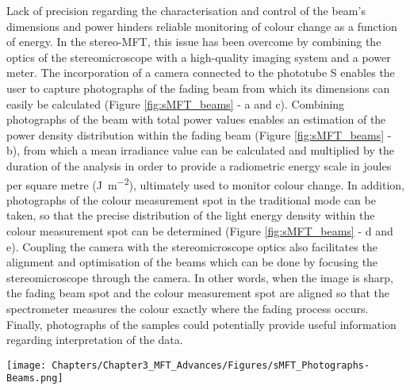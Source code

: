 Lack of precision regarding the characterisation and control of the beam’s dimensions and power hinders reliable monitoring of colour change as a function of energy. In the stereo-MFT, this issue has been overcome by combining the optics of the stereomicroscope with a high-quality imaging system and a power meter. The incorporation of a camera connected to the phototube S enables the user to capture photographs of the fading beam from which its dimensions can easily be calculated (Figure \ref{fig:sMFT_beams} - a and c). Combining photographs of the beam with total power values enables an estimation of the power density distribution within the fading beam (Figure \ref{fig:sMFT_beams} - b), from which a mean irradiance value can be calculated and multiplied by the duration of the analysis in order to provide a radiometric energy scale in joules per square metre (\unit{\joule\per\square\metre}), ultimately used to monitor colour change. In addition, photographs of the colour measurement spot in the traditional mode can be taken, so that the precise distribution of the light energy density within the colour measurement spot can be determined (Figure \ref{fig:sMFT_beams} - d and e). Coupling the camera with the stereomicroscope optics also facilitates the alignment and optimisation of the beams which can be done by focusing the stereomicroscope through the camera. In other words, when the image is sharp, the fading beam spot and the colour measurement spot are aligned so that the spectrometer measures the colour exactly where the fading process occurs. Finally, photographs of the samples could potentially provide useful information regarding interpretation of the data.\\


\begin{figure*}
\centering
\texttt{[image: Chapters/Chapter3\_MFT\_Advances/Figures/sMFT\_Photographs-Beams.png]}
\caption[\hspace{0.3cm}Beams characterisation]{Beams characterisation: (a) photograph of the fading spot; (b) power density distribution; (c) profile of the power density distribution; (d) photograph of the colour measurement spot; (e) power density distribution within the colour measurement spot.}
\label{fig:sMFT_beams}
\end{figure*}


